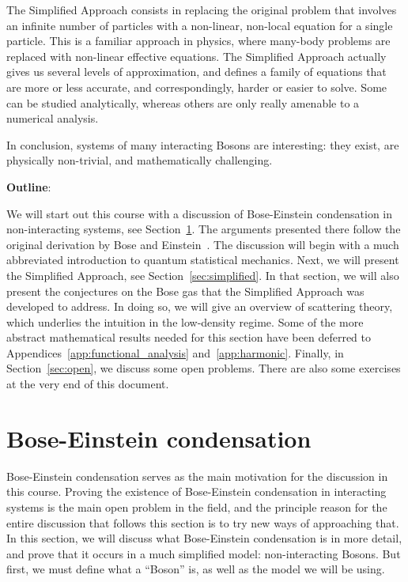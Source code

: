 \documentclass{ian}
\begin{document}
\indent
The Simplified Approach consists in replacing the original problem that involves an infinite number of particles with a non-linear, non-local equation for a single particle.
This is a familiar approach in physics, where many-body problems are replaced with non-linear effective equations.
The Simplified Approach actually gives us several levels of approximation, and defines a family of equations that are more or less accurate, and correspondingly, harder or easier to solve.
Some can be studied analytically, whereas others are only really amenable to a numerical analysis.
\bigskip

\indent
In conclusion, systems of many interacting Bosons are interesting: they exist, are physically non-trivial, and mathematically challenging.
\bigskip

{\bf Outline}:\par
\indent
We will start out this course with a discussion of Bose-Einstein condensation in non-interacting systems, see Section\-~\ref{sec:statmech}.
The arguments presented there follow the original derivation by Bose and Einstein\-~\cite{Bo24,Ei24}.
The discussion will begin with a much abbreviated introduction to quantum statistical mechanics.
Next, we will present the Simplified Approach, see Section\-~\ref{sec:simplified}.
In that section, we will also present the conjectures on the Bose gas that the Simplified Approach was developed to address.
In doing so, we will give an overview of scattering theory, which underlies the intuition in the low-density regime.
Some of the more abstract mathematical results needed for this section have been deferred to Appendices\-~\ref{app:functional_analysis} and\-~\ref{app:harmonic}.
Finally, in Section\-~\ref{sec:open}, we discuss some open problems.
There are also some exercises at the very end of this document.


\section{Bose-Einstein condensation}\label{sec:statmech}
\indent
Bose-Einstein condensation serves as the main motivation for the discussion in this course.
Proving the existence of Bose-Einstein condensation in interacting systems is the main open problem in the field, and the principle reason for the entire discussion that follows this section is to try new ways of approaching that.
In this section, we will discuss what Bose-Einstein condensation is in more detail, and prove that it occurs in a much simplified model: non-interacting Bosons.
But first, we must define what a ``Boson'' is, as well as the model we will be using.
\bigskip
\end{document}
